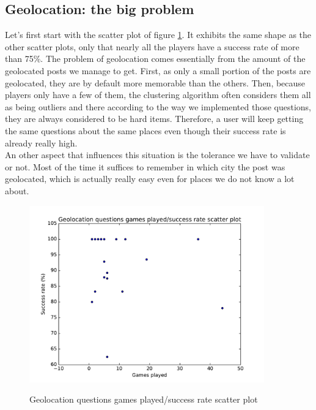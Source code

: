 \subsection{Geolocation: the big problem}\label{subsec:geolocissue}
Let's first start with the scatter plot of figure \ref{fig:geoScatter}. It exhibits the same shape as the other scatter plots, only that nearly all the players have a success rate of more than 75\%. The problem of geolocation comes essentially from the amount of the geolocated posts we manage to get. First, as only a small portion of the posts are geolocated, they are by default more memorable than the others. Then, because players only have a few of them, the clustering algorithm often considers them all as being outliers and there according to the way we implemented those questions, they are always considered to be hard items. Therefore, a user will keep getting the same questions about the same places even though their success rate is already really high.\\
An other aspect that influences this situation is the tolerance we have to validate or not. Most of the time it suffices to remember in which city the post was geolocated, which is actually really easy even for places we do not know a lot about.

\begin{figure}
\centering
{\includegraphics[width=4in]{images/geo_scatter.pdf}}
\caption{Geolocation questions games played/success rate scatter plot}
\label{fig:geoScatter}
\end{figure}

